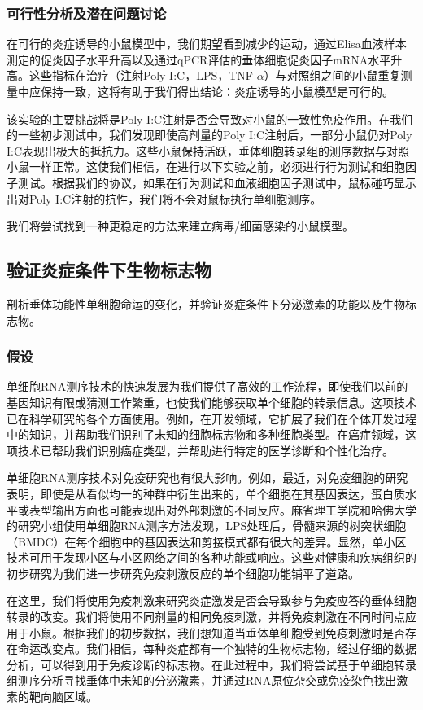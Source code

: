 \documentclass[class = opening]{whuthesis}
\begin{document}
\subsubsection{可行性分析及潜在问题讨论}
  在可行的炎症诱导的小鼠模型中，我们期望看到减少的运动，通过Elisa血液样本测定的促炎因子水平升高以及通过qPCR评估的垂体细胞促炎因子mRNA水平升高。这些指标在治疗（注射Poly I:C，LPS，TNF-$\alpha$）与对照组之间的小鼠重复测量中应保持一致，这将有助于我们得出结论：炎症诱导的小鼠模型是可行的。

  该实验的主要挑战将是Poly I:C注射是否会导致对小鼠的一致性免疫作用。在我们的一些初步测试中，我们发现即使高剂量的Poly I:C注射后，一部分小鼠仍对Poly I:C表现出极大的抵抗力。这些小鼠保持活跃，垂体细胞转录组的测序数据与对照小鼠一样正常。这使我们相信，在进行以下实验之前，必须进行行为测试和细胞因子测试。根据我们的协议，如果在行为测试和血液细胞因子测试中，鼠标碰巧显示出对Poly I:C注射的抗性，我们将不会对鼠标执行单细胞测序。

  我们将尝试找到一种更稳定的方法来建立病毒/细菌感染的小鼠模型。

\subsection{验证炎症条件下生物标志物}
  剖析垂体功能性单细胞命运的变化，并验证炎症条件下分泌激素的功能以及生物标志物。
\subsubsection{假设}
  单细胞RNA测序技术的快速发展为我们提供了高效的工作流程，即使我们以前的基因知识有限或猜测工作繁重，也使我们能够获取单个细胞的转录信息。这项技术已在科学研究的各个方面使用。例如，在开发领域，它扩展了我们在个体开发过程中的知识，并帮助我们识别了未知的细胞标志物和多种细胞类型。在癌症领域，这项技术已帮助我们识别癌症类型，并帮助进行特定的医学诊断和个性化治疗。

  单细胞RNA测序技术对免疫研究也有很大影响。例如，最近，对免疫细胞的研究表明，即使是从看似均一的种群中衍生出来的，单个细胞在其基因表达，蛋白质水平或表型输出方面也可能表现出对外部刺激的不同反应。麻省理工学院和哈佛大学的研究小组使用单细胞RNA测序方法发现，LPS处理后，骨髓来源的树突状细胞（BMDC）在每个细胞中的基因表达和剪接模式都有很大的差异。显然，单小区技术可用于发现小区与小区网络之间的各种功能或响应。这些对健康和疾病组织的初步研究为我们进一步研究免疫刺激反应的单个细胞功能铺平了道路。

  在这里，我们将使用免疫刺激来研究炎症激发是否会导致参与免疫应答的垂体细胞转录的改变。我们将使用不同剂量的相同免疫刺激，并将免疫刺激在不同时间点应用于小鼠。根据我们的初步数据，我们想知道当垂体单细胞受到免疫刺激时是否存在命运改变点。我们相信，每种炎症都有一个独特的生物标志物，经过仔细的数据分析，可以得到用于免疫诊断的标志物。在此过程中，我们将尝试基于单细胞转录组测序分析寻找垂体中未知的分泌激素，并通过RNA原位杂交或免疫染色找出激素的靶向脑区域。
\end{document}
